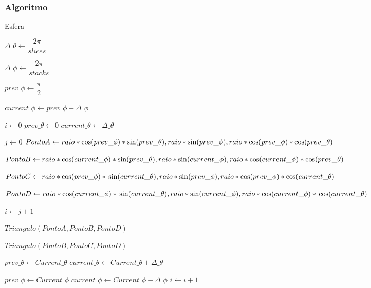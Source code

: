 \subsubsection{Algoritmo}

\begin{algorithm}
\caption{Esfera}\label{euclid}
\begin{algorithmic}[1]
\State $\Delta\_\theta \gets \dfrac{2\pi}{slices}$

\State $\Delta\_\phi \gets \dfrac{2\pi}{stacks}$

\State $prev\_\phi \gets \dfrac{\pi}{2}$

\State $current\_\phi \gets prev\_\phi - \Delta\_\phi$





\State $i \gets 0$
\State $prev\_\theta \gets 0$
\State $current\_\theta \gets \Delta\_\theta$

\State $j \gets 0$
\State $Ponto A \gets raio*\cos(prev\_\phi) * \sin(prev\_\theta),  
\newline raio*\sin(prev\_\phi),
\newline raio*\cos(prev\_\phi) * \cos(prev\_\theta)$

\State $Ponto B \gets raio*\cos(current\_\phi)*\sin(prev\_\theta),
\newline raio*\sin(current\_\phi),
\newline raio*\cos(current\_\phi) * \cos(prev\_\theta)$

\State $Ponto C \gets raio*\cos(prev\_\phi) * 
\newline \sin(current\_\theta),raio*\sin(prev\_\phi),
\newline raio*\cos(prev\_\phi) * \cos(current\_\theta)$

\State $Ponto D \gets raio*\cos(current\_\phi) *
\newline \sin(current\_\theta),raio*\sin(current\_\phi),raio*\cos(current\_\phi) * \newline \cos(current\_\theta)$

\State $i \gets j + 1$ 

\State $Triangulo(Ponto A, Ponto B, Ponto D)$

\State $Triangulo(Ponto B, Ponto C, Ponto D)$

\State $prev\_\theta \gets Current\_\theta$
\State $current\_\theta \gets Current\_\theta + \Delta\_\theta $
\EndWhile

\State $prev\_\phi \gets Current\_\phi$
\State $current\_\phi \gets Current\_\phi - \Delta\_\phi $
\State $i \gets i + 1$ 

\EndWhile

\end{algorithmic}
\end{algorithm}
